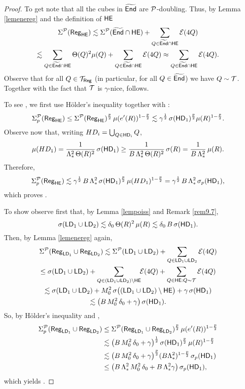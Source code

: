 \begin{proof}
To get  note that all the cubes in ${\widetilde{{\mathsf{End}}}}$ are ${\mathcal P}$-doubling. Thus, by Lemma \ref{lemenereg} and the definition of ${\mathsf {HE}}$
\begin{multline*}
\Sigma^{\mathcal P}({\mathsf{Reg}}_{\mathsf {HE}}) \lesssim \Sigma^{\mathcal P}({\widetilde{{\mathsf{End}}}}\cap{\mathsf {HE}}) + \sum_{Q\in{\widetilde{{\mathsf{End}}}}\cap {\mathsf {HE}}}{\mathcal E}(4Q)\\
 \lesssim \sum_{Q\in{\widetilde{{\mathsf{End}}}}\cap {\mathsf {HE}}}\Theta(Q)^2\mu(Q) + \sum_{Q\in{\widetilde{{\mathsf{End}}}}\cap {\mathsf {HE}}}{\mathcal E}(4Q) \approx \sum_{Q\in{\widetilde{{\mathsf{End}}}}\cap {\mathsf {HE}}}{\mathcal E}(4Q).
\end{multline*}
Observe that for all $Q\in{\mathcal T}_{{\mathsf{Reg}}}$ (in particular, for all $Q\in{\widetilde{{\mathsf{End}}}}$) we have $Q\sim {\mathcal T}$. Together with the fact that ${\mathcal T}$ is $\gamma$-nice,  follows.

To see , we first use H\"older's inequality together with :
$$
\Sigma_p^{\mathcal P}({\mathsf{Reg}}_{\mathsf {HE}})\leq \Sigma^{\mathcal P}({\mathsf{Reg}}_{\mathsf {HE}})^{\frac p2}\,\mu(e'(R))^{1-\frac p2}\lesssim \gamma^{\frac 12}\,\sigma({\mathsf{HD}}_1)^{\frac p2}
\mu(R)^{1-\frac p2}.
$$
Observe now that, writing $HD_i=\bigcup_{Q\in{\mathsf{HD}}_i}Q$,
\begin{equation}\label{eqmuhd1}
\mu(HD_1) = \frac1{\Lambda_*^2\,\Theta(R)^2}\,\sigma({\mathsf{HD}}_1) \geq \frac1{B\,\Lambda_*^2\,\Theta(R)^2}\,\sigma(R) = \frac1{B\,\Lambda_*^2}\,\mu(R).
\end{equation}
Therefore,
$$
\Sigma_p^{\mathcal P}({\mathsf{Reg}}_{\mathsf {HE}})\lesssim \gamma^{\frac 12}\,B\,\Lambda_*^2\,\sigma({\mathsf{HD}}_1)^{\frac p2}\,\mu(HD_1)^{1-\frac p2}
= \gamma^{\frac 12}\,B\,\Lambda_*^2\,\sigma_p({\mathsf{HD}}_1),$$
which proves .

To show  observe first that, by Lemma \ref{lempoiss} and Remark \ref{rem9.7},
$$\sigma({\mathsf{LD}}_1\cup{\mathsf{LD}}_2) \lesssim \delta_0\,\Theta(R)^2\,\mu(R)\lesssim \delta_0\,B\,\sigma({\mathsf{HD}}_1).$$
Then, by Lemma \ref{lemenereg} again, 
\begin{multline*}
\Sigma^{\mathcal P}({\mathsf{Reg}}_{{\mathsf{LD}}_1}\cup {\mathsf{Reg}}_{{\mathsf{LD}}_2}) \lesssim \Sigma^{\mathcal P}({\mathsf{LD}}_1\cup{\mathsf{LD}}_2)+\sum_{Q\in
{\mathsf{LD}}_1\cup {\mathsf{LD}}_2} {\mathcal E}(4Q)\\
 \leq \sigma({\mathsf{LD}}_1\cup{\mathsf{LD}}_2)+ \sum_{Q\in
({\mathsf{LD}}_1\cup {\mathsf{LD}}_2)\setminus{\mathsf {HE}}} \!\!{\mathcal E}(4Q) + \sum_{Q\in{\mathsf {HE}}:Q\sim{\mathcal T}} {\mathcal E}(4Q)\\
\lesssim \sigma({\mathsf{LD}}_1\cup{\mathsf{LD}}_2) + M_0^2\,\sigma\big(({\mathsf{LD}}_1\cup {\mathsf{LD}}_2)\setminus{\mathsf {HE}}\big) + \gamma\,\sigma({\mathsf{HD}}_1)
 \\
 \lesssim
\big(B\,M_0^2\,\delta_0 + \gamma\big)\,\sigma({\mathsf{HD}}_1).
\end{multline*}
So, by H\"older's inequality and ,
\begin{align*}
\Sigma_p^{\mathcal P}({\mathsf{Reg}}_{{\mathsf{LD}}_1}\cup {\mathsf{Reg}}_{{\mathsf{LD}}_2})& \leq \Sigma^{\mathcal P}({\mathsf{Reg}}_{{\mathsf{LD}}_1}\cup {\mathsf{Reg}}_{{\mathsf{LD}}_2})^{\frac p2}\,\mu(e'(R))^{1-\frac p2}\\
& \lesssim \big(B\,M_0^2\,\delta_0 + \gamma\big)^{\frac 12}\,\sigma({\mathsf{HD}}_1)^{\frac p2}\,\mu(R)^{1-\frac p2}\\
&\lesssim
\big(B\,M_0^2\,\delta_0 + \gamma\big)^{\frac p2} (B\Lambda_*^2)^{1-\frac p2}
\,\sigma_p({\mathsf{HD}}_1)\\
& \leq \big(B\,\Lambda_*^2\,M_0^2\,\delta_0 + B\,\Lambda_*^2\gamma\big)\,\sigma_p({\mathsf{HD}}_1),
\end{align*}
which yields .


\end{proof}
